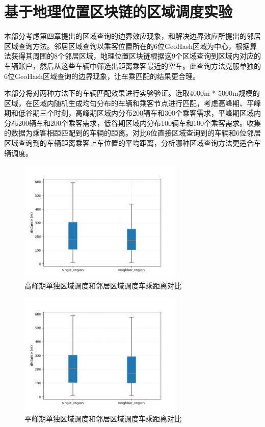 \section{基于地理位置区块链的区域调度实验}

本部分考虑第四章提出的区域查询的边界效应现象，和解决边界效应所提出的邻居区域查询方法。邻居区域查询以乘客位置所在的6位GeoHash区域为中心，根据算法获得其周围的8个邻居区域，地理位置区块链根据这9个区域查询到区域内对应的车辆账户，然后从这些车辆中筛选出距离乘客最近的空车。此查询方法克服单独的6位GeoHash区域查询的边界现象，让车乘匹配的结果更合理。

本部分将对两种方法下的车辆匹配效果进行实验验证。选取4000m * 5000m规模的区域，在区域内随机生成均匀分布的车辆和乘客节点进行匹配，考虑高峰期、平峰期和低谷期三个时刻，高峰期区域内分布200辆车和300个乘客需求，平峰期区域内分布200辆车和200个乘客需求，低谷期区域内分布100辆车和100个乘客需求。收集的数据为乘客相距匹配到的车辆的距离。对比6位直接区域查询到的车辆和6位邻居区域查询到的车辆距离乘客上车位置的平均距离，分析哪种区域查询方法更适合车辆调度。

\begin{figure}[h]
  \centering
  \includegraphics[height=0.25\textheight,width=0.7\textwidth]{figures/高峰车乘匹配}
  \caption{高峰期单独区域调度和邻居区域调度车乘距离对比}\label{fig:highRegionDistance}
\end{figure}

\begin{figure}[h]
  \centering
  \includegraphics[height=0.25\textheight,width=0.7\textwidth]{figures/平峰车乘匹配}
  \caption{平峰期单独区域调度和邻居区域调度车乘距离对比}\label{fig:pingRegionDistance}
\end{figure}


